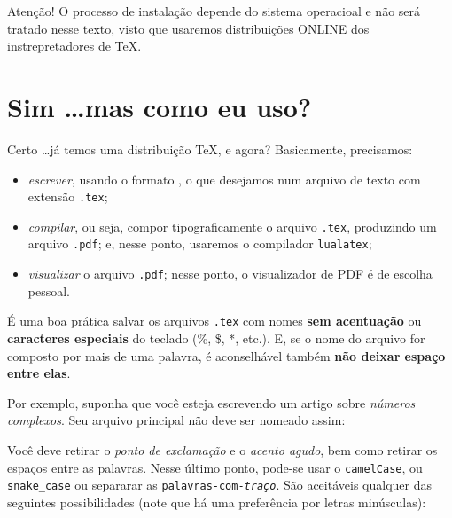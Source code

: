 \begin{atencao}{Atenção!}{\exclamacao}
  O processo de instalação depende do sistema operacioal e não será tratado nesse 
  texto, visto que usaremos distribuições ONLINE dos instrepretadores de \TeX{}.  
\end{atencao}

\section{Sim \ldots mas como eu uso?} %
\label{sec:usando}

Certo \ldots já temos uma distribuição \TeX{}, e agora?
Basicamente, precisamos:

\begin{itemize}
  \item \textit{escrever}, usando o formato , o que desejamos num 
    arquivo de texto com extensão \texttt{.tex};
  \item \textit{compilar}, ou seja, compor tipograficamente o arquivo \texttt{.tex}, 
    produzindo um arquivo \texttt{.pdf}; e, nesse ponto, usaremos o compilador 
    \texttt{lualatex};
  \item \textit{visualizar} o arquivo \texttt{.pdf}; nesse ponto, o visualizador
    de PDF é de escolha pessoal.
\end{itemize}

É uma boa prática salvar os arquivos \texttt{.tex} com nomes \textbf{sem acentuação}
ou \textbf{caracteres especiais} do teclado (\%, \$, *, etc.).
E, se o nome do arquivo for composto por mais de uma palavra, é aconselhável 
também \textbf{não deixar espaço entre elas}.

Por exemplo, suponha que você esteja escrevendo um artigo sobre \textit{números complexos}.
Seu arquivo principal não deve ser nomeado assim: 


Você deve retirar o \textit{ponto de exclamação} e o \textit{acento agudo}, bem 
como retirar os espaços entre as palavras.
Nesse último ponto, pode-se usar o \texttt{camelCase}, ou \texttt{snake\_case} 
ou separarar as \texttt{palavras-com-\textit{traço}}.
São aceitáveis qualquer das seguintes possibilidades (note que há uma preferência
por letras minúsculas):


